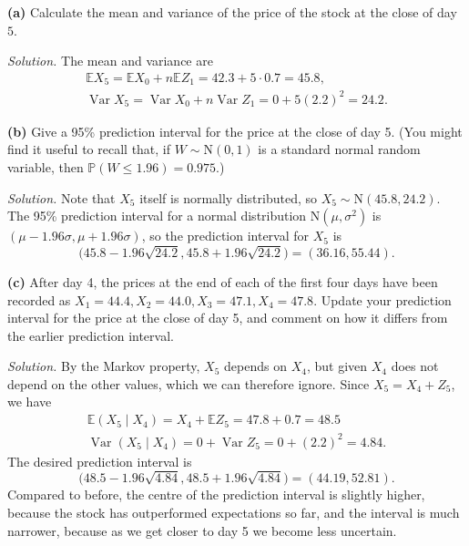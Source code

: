 \documentclass[
  a4paper,
]{article}
\theoremstyle{definition}
\theoremstyle{definition}
\theoremstyle{definition}
\theoremstyle{remark}
\begin{document}
\textbf{(a)} Calculate the mean and variance of the price of the stock at the close of day \(5\).

\begin{myanswers}

\emph{Solution.} The mean and variance are
\begin{gather*}
  \mathbb EX_5 = \mathbb E X_0 + n \mathbb E Z_1 = 42.3 + 5 \cdot 0.7 = 45.8 , \\
  \operatorname{Var}X_5 = \operatorname{Var}X_0 + n \operatorname{Var}Z_1 = 0 + 5 (2.2)^2 = 24.2 .
  \end{gather*}

\end{myanswers}

\textbf{(b)} Give a 95\% prediction interval for the price at the close of day 5. (You might find it useful to recall that, if \(W \sim \text{N}(0,1)\) is a standard normal random variable, then \(\mathbb P(W \leq 1.96) = 0.975\).)

\begin{myanswers}

\emph{Solution.} Note that \(X_5\) itself is normally distributed, so \(X_5 \sim \text{N}(45.8,24.2)\). The 95\% prediction interval for a normal distribution \(\text{N}(\mu, \sigma^2)\) is \((\mu - 1.96\sigma, \mu + 1.96\sigma)\), so the prediction interval for \(X_5\) is
\[ \big(45.8 - 1.96\sqrt{24.2},  45.8 + 1.96\sqrt{24.2}\big) = (36.16, 55.44) . \]

\end{myanswers}

\textbf{(c)} After day 4, the prices at the end of each of the first four days have been recorded as \(X_1 = 44.4, X_2 = 44.0, X_3 = 47.1, X_4 = 47.8\). Update your prediction interval for the price at the close of day 5, and comment on how it differs from the earlier prediction interval.

\begin{myanswers}

\emph{Solution.} By the Markov property, \(X_5\) depends on \(X_4\), but given \(X_4\) does not depend on the other values, which we can therefore ignore. Since \(X_5 = X_4 + Z_5\), we have
\begin{gather*}
  \mathbb E(X_5 \mid X_4) = X_4 + \mathbb E Z_5 = 47.8 + 0.7 = 48.5 \\
  \operatorname{Var}(X_5 \mid X_4) = 0 + \operatorname{Var}Z_5 = 0 + (2.2)^2 = 4.84.
  \end{gather*}
The desired prediction interval is
\[ \big(48.5 - 1.96\sqrt{4.84},  48.5+ 1.96\sqrt{4.84}\big) = (44.19, 52.81) . \]
Compared to before, the centre of the prediction interval is slightly higher, because the stock has outperformed expectations so far, and the interval is much narrower, because as we get closer to day 5 we become less uncertain.

\end{myanswers}
\end{document}
